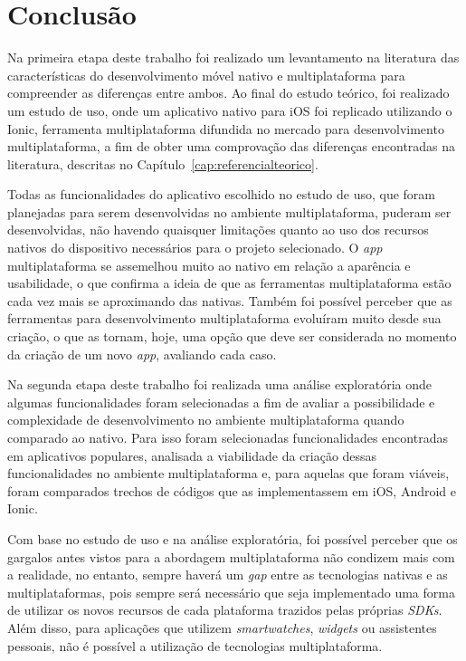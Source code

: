 \chapter{Conclusão} \label{cap:consideracoespreliminares}
Na primeira etapa deste trabalho foi realizado um levantamento na literatura das características do desenvolvimento móvel nativo e multiplataforma para compreender as diferenças entre ambos. Ao final do estudo teórico, foi 
realizado um estudo de uso, onde um aplicativo nativo para iOS foi replicado utilizando o Ionic, ferramenta multiplataforma difundida 
no mercado para desenvolvimento multiplataforma, a fim de obter uma comprovação das diferenças encontradas na literatura, descritas no Capítulo~\ref{cap:referencialteorico}.

Todas as funcionalidades do aplicativo escolhido no estudo de uso, que foram planejadas para serem desenvolvidas no ambiente multiplataforma, puderam ser desenvolvidas, não havendo quaisquer limitações quanto ao uso dos 
recursos nativos do dispositivo necessários para o projeto selecionado. O \textit{app} multiplataforma se assemelhou muito ao nativo em relação a aparência e usabilidade, o que confirma a ideia de que as ferramentas 
multiplataforma estão cada vez mais se aproximando das nativas. Também foi possível perceber que as ferramentas para desenvolvimento multiplataforma evoluíram muito desde sua criação, o que as tornam, hoje, uma 
opção que deve ser considerada no momento da criação de um novo \textit{app}, avaliando cada caso.

Na segunda etapa deste trabalho foi realizada uma análise exploratória onde algumas funcionalidades foram selecionadas a fim de avaliar a possibilidade e complexidade de desenvolvimento no ambiente 
multiplataforma quando comparado ao nativo. Para isso foram selecionadas funcionalidades encontradas em aplicativos populares, analisada a viabilidade da criação dessas funcionalidades no ambiente multiplataforma e, 
para aquelas que foram viáveis, foram comparados trechos de códigos que as implementassem em iOS, Android e Ionic. 

Com base no estudo de uso e na análise exploratória, foi possível perceber que os gargalos antes vistos para a abordagem multiplataforma não condizem mais com a realidade, no entanto, sempre haverá um \textit{gap} entre as tecnologias 
nativas e as multiplataformas, pois sempre será necessário que seja implementado uma forma de utilizar os novos recursos de cada plataforma trazidos pelas próprias \textit{SDKs}. Além disso, para aplicações que utilizem 
\textit{smartwatches}, \textit{widgets} ou assistentes pessoais, não é possível a utilização de tecnologias multiplataforma.

